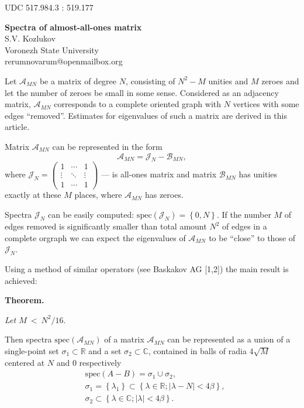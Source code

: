 \documentclass[11pt]{article}
\begin{document}
\small{UDC 517.984.3 : 519.177}

\begin{center}
\textbf{Spectra of almost-all-ones matrix}\\
\small{S.V. Kozlukov} \\
\small{Voronezh State University} \\
\small{rerumnovarum@openmailbox.org} \\
\end{center}

Let \( \mathscr{A}_{MN} \) be a matrix of degree \( N \),
consisting of \( N^2 - M \) unities and \( M \) zeroes
and let the number of zeroes be small in some sense.
Considered as an adjacency matrix,
\( \mathscr{A}_{MN} \) corresponds to a complete oriented graph
with \( N \) vertices
with some edges ``removed''.
Estimates for eigenvalues of such a matrix are derived in this article.

Matrix \( \mathscr{A}_{MN} \) can be represented in the form
\[
    \mathscr{A}_{MN} = \mathscr{J}_{N} - \mathscr{B}_{MN},
    \]
where \(
\mathscr{J}_{N} =
\begin{pmatrix}1 & \cdots & 1 \\
\vdots & \ddots & \vdots \\
1 & \cdots & 1
\end{pmatrix} \) --- is all-ones matrix
and matrix \( \mathscr{B}_{MN} \) has unities
exactly at these \( M \) places,
where \( \mathscr{A}_{MN} \) has zeroes.

Spectra \( \mathscr{J}_{N} \) can be easily computed:
\( \mathrm{spec}\left({\mathscr{J}_{N}}\right) = \left\{0, N \right\} \).
If the number \( M \) of edges removed
is significantly smaller than total amount \( N^2 \) of edges in a complete orgraph
we can expect the eigenvalues of
\( \mathscr{A}_{MN} \) to be ``close'' to those of \( \mathscr{J}_{N} \).

Using a method of similar operators (see Baskakov AG [1,2])
the main result is achieved:

\textbf{Theorem.}

{\it
Let
\(M~<~\displaystyle{N^2/16}. \)

Then spectra \( \mathrm{spec}\left({\mathscr{A}_{MN}}\right) \)
of a matrix \( \mathscr{A}_{MN} \)
can be represented as a union of
a single-point set \( \sigma_1 \subset \mathbb{R} \)
and a set \( \sigma_2 \subset \mathbb{C} \),
contained in balls of radia \( 4\sqrt{M} \)
centered at \( N \) and \( 0 \) respectively
\begin{equation*}\begin{aligned}
    & \mathrm{spec}\left({A-B}\right) = \sigma_1 \cup \sigma_2, \\
    & \sigma_1 = \left\{ \lambda_1 \right\}
      \subset \left\{ \lambda\in\mathbb{R}; \lvert \lambda - N\rvert < 4\beta \right\}, \\
    & \sigma_2 \subset \left\{\lambda\in\mathbb{C}; \lvert\lambda\rvert <4\beta \right\}. \\
\end{aligned}\end{equation*}
}
\end{document}

